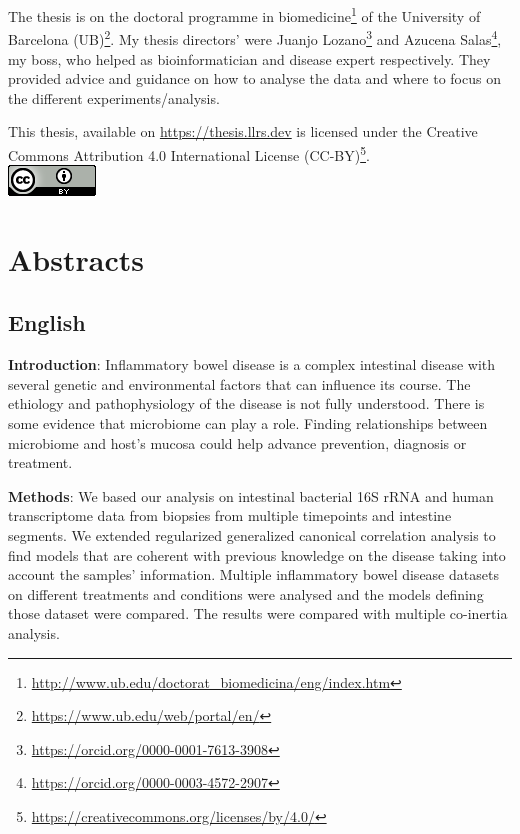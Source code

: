 \documentclass[
  12pt,
  a4paper,
  twoside,
  openright]{book}
\DeclareRobustCommand{\href}[2]{#2\footnote{\url{#1}}}
\begin{document}
The thesis is on the \href{http://www.ub.edu/doctorat_biomedicina/eng/index.htm}{doctoral programme in biomedicine} of the \href{https://www.ub.edu/web/portal/en/}{University of Barcelona (UB)}.
My thesis directors' were \href{https://orcid.org/0000-0001-7613-3908}{Juanjo Lozano} and \href{https://orcid.org/0000-0003-4572-2907}{Azucena Salas}, my boss, who helped as bioinformatician and disease expert respectively.
They provided advice and guidance on how to analyse the data and where to focus on the different experiments/analysis.

This thesis, available on \url{https://thesis.llrs.dev} is licensed under the \href{https://creativecommons.org/licenses/by/4.0/}{Creative Commons Attribution 4.0 International License (CC-BY)}.\\
\includegraphics{images/by.png}

\hypertarget{abstracts}{%
\chapter*{Abstracts}\label{abstracts}}

\hypertarget{english}{%
\section*{English}\label{english}}

\textbf{Introduction}: Inflammatory bowel disease is a complex intestinal disease with several genetic and environmental factors that can influence its course.
The ethiology and pathophysiology of the disease is not fully understood.
There is some evidence that microbiome can play a role.
Finding relationships between microbiome and host's mucosa could help advance prevention, diagnosis or treatment.

\textbf{Methods}: We based our analysis on intestinal bacterial 16S rRNA and human transcriptome data from biopsies from multiple timepoints and intestine segments.
We extended regularized generalized canonical correlation analysis to find models that are coherent with previous knowledge on the disease taking into account the samples' information.
Multiple inflammatory bowel disease datasets on different treatments and conditions were analysed and the models defining those dataset were compared.
The results were compared with multiple co-inertia analysis.
\end{document}
